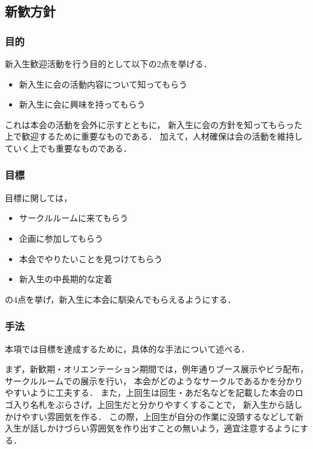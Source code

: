 \subsection*{新歓方針}


\subsubsection*{目的}
新入生歓迎活動を行う目的として以下の2点を挙げる．
\begin{itemize}
\item 新入生に会の活動内容について知ってもらう
\item 新入生に会に興味を持ってもらう
\end{itemize}
これは本会の活動を会外に示すとともに，
新入生に会の方針を知ってもらった上で歓迎するために重要なものである．
加えて，人材確保は会の活動を維持していく上でも重要なものである．

\subsubsection*{目標}
目標に関しては，
\begin{itemize}
\item サークルルームに来てもらう
\item 企画に参加してもらう
\item 本会でやりたいことを見つけてもらう
\item 新入生の中長期的な定着
\end{itemize}
の4点を挙げ，新入生に本会に馴染んでもらえるようにする．

\subsubsection*{手法}
本項では目標を達成するために，具体的な手法について述べる．

まず，新歓期・オリエンテーション期間では，例年通りブース展示やビラ配布，サークルルームでの展示を行い，
本会がどのようなサークルであるかを分かりやすいように工夫する．
また，上回生は回生・あだ名などを記載した本会のロゴ入り名札をぶらさげ，上回生だと分かりやすくすることで，
新入生から話しかけやすい雰囲気を作る．
この際，上回生が自分の作業に没頭するなどして新入生が話しかけづらい雰囲気を作り出すことの無いよう，適宜注意するようにする．

